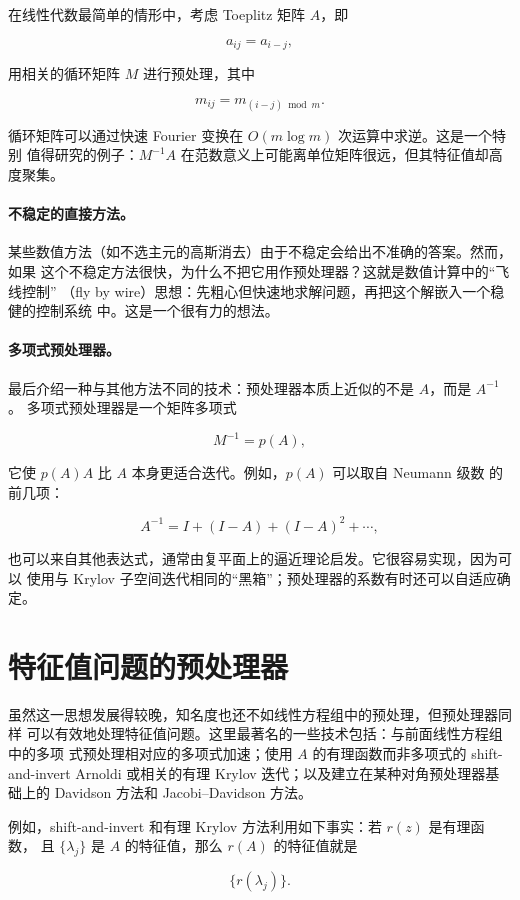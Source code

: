 \documentclass[UTF8,fontset=none,12pt]{ctexart}
\begin{document}
在线性代数最简单的情形中，考虑 Toeplitz 矩阵 $A$，即

\[
a_{ij}=a_{i-j},
\]

用相关的循环矩阵 $M$ 进行预处理，其中

\[
m_{ij}=m_{(i-j)\bmod m}.
\]

循环矩阵可以通过快速 Fourier 变换在 $O(m\log m)$ 次运算中求逆。这是一个特别
值得研究的例子：$M^{-1}A$ 在范数意义上可能离单位矩阵很远，但其特征值却高度聚集。

\paragraph{不稳定的直接方法。}
某些数值方法（如不选主元的高斯消去）由于不稳定会给出不准确的答案。然而，如果
这个不稳定方法很快，为什么不把它用作预处理器？这就是数值计算中的“飞线控制”
（fly by wire）思想：先粗心但快速地求解问题，再把这个解嵌入一个稳健的控制系统
中。这是一个很有力的想法。

\paragraph{多项式预处理器。}
最后介绍一种与其他方法不同的技术：预处理器本质上近似的不是 $A$，而是 $A^{-1}$。
多项式预处理器是一个矩阵多项式

\[
M^{-1}=p(A),
\]

它使 $p(A)A$ 比 $A$ 本身更适合迭代。例如，$p(A)$ 可以取自 Neumann 级数
的前几项：

\[
A^{-1}=I+(I-A)+(I-A)^2+\cdots,
\]

也可以来自其他表达式，通常由复平面上的逼近理论启发。它很容易实现，因为可以
使用与 Krylov 子空间迭代相同的“黑箱”；预处理器的系数有时还可以自适应确定。

\section*{特征值问题的预处理器}

虽然这一思想发展得较晚，知名度也还不如线性方程组中的预处理，但预处理器同样
可以有效地处理特征值问题。这里最著名的一些技术包括：与前面线性方程组中的多项
式预处理相对应的多项式加速；使用 $A$ 的有理函数而非多项式的 shift-and-invert
Arnoldi 或相关的有理 Krylov 迭代；以及建立在某种对角预处理器基础上的 Davidson
方法和 Jacobi--Davidson 方法。

例如，shift-and-invert 和有理 Krylov 方法利用如下事实：若 $r(z)$ 是有理函数，
且 $\{\lambda_j\}$ 是 $A$ 的特征值，那么 $r(A)$ 的特征值就是

\[
\{r(\lambda_j)\}.
\]
\end{document}
